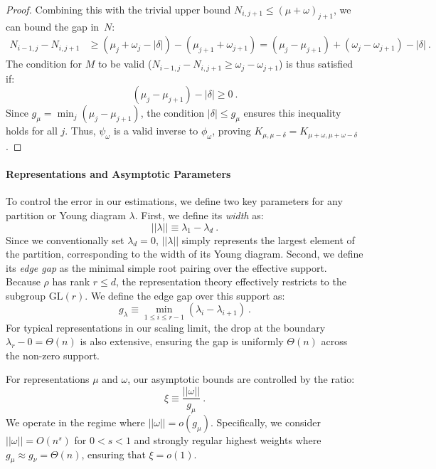\documentclass[11pt,letterpaper]{article}
\begin{document}
\begin{proof}
Combining this with the trivial upper bound $N_{i,j+1} \leq (\mu+\omega)_{j+1}$, we can bound the gap in~$N$:
\begin{align}
N_{i-1,j} - N_{i,j+1} &\geq (\mu_j + \omega_j - |\delta|) - (\mu_{j+1} + \omega_{j+1}) = (\mu_j - \mu_{j+1}) + (\omega_j - \omega_{j+1}) - |\delta| \ .
\end{align}
The condition for $M$ to be valid ($N_{i-1,j} - N_{i,j+1} \geq \omega_j - \omega_{j+1}$) is thus satisfied if:
\begin{equation}
 (\mu_j - \mu_{j+1}) - |\delta| \geq 0 \ .
\end{equation}
Since $g_\mu = \min_j (\mu_j - \mu_{j+1})$, the condition $|\delta| \leq g_\mu$ ensures this inequality holds for all $j$. Thus, $\psi_\omega$ is a valid inverse to $\phi_\omega$, proving $K_{\mu,\mu-\delta} = K_{\mu+\omega,\mu+\omega-\delta}$.
\end{proof}

\paragraph{Representations and Asymptotic Parameters}
To control the error in our estimations, we define two key parameters for any partition or Young diagram $\lambda$. First, we define its \emph{width} as:
\begin{equation}
    ||\lambda|| \equiv \lambda_1 - \lambda_d \ .
\end{equation}
Since we conventionally set $\lambda_d=0$, $||\lambda||$ simply represents the largest element of the partition, corresponding to the width of its Young diagram. Second, we define its \emph{edge gap} as the minimal simple root pairing over the effective support. Because $\rho$ has rank $r \le d$, the representation theory effectively restricts to the subgroup $\mathrm{GL}(r)$. We define the edge gap over this support as:
\begin{equation}
    g_\lambda \equiv \min_{1\leq i\leq r-1}(\lambda_i-\lambda_{i+1}) \ .
\end{equation}
For typical representations in our scaling limit, the drop at the boundary $\lambda_r - 0 = \Theta(n)$ is also extensive, ensuring the gap is uniformly $\Theta(n)$ across the non-zero support.

For representations $\mu$ and $\omega$, our asymptotic bounds are controlled by the ratio:
\begin{equation}
    \xi \equiv \frac{||\omega||}{g_\mu} \ .
\end{equation}
We operate in the regime where $||\omega|| = o(g_\mu)$. Specifically, we consider $||\omega|| = O(n^s)$ for $0 < s < 1$ and strongly regular highest weights where $g_\mu \approx g_\nu = \Theta(n)$, ensuring that $\xi = o(1)$.
\end{document}
